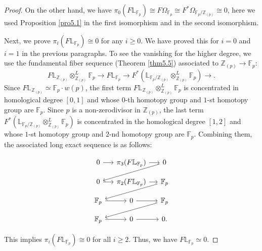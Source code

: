 \documentclass[11pt, a4paper]{amsart}
\theoremstyle{plain}
\theoremstyle{definition}
\begin{document}
\begin{proof}
    On the other hand, we have $\pi_0(F\mathbb L_{\mathbb F_p})\cong F\Omega_{\mathbb F_p}\cong F^*\Omega_{\mathbb F_p/\mathbb Z_{(p)}}\cong 0$, here we used Proposition \ref{pro5.1} in the first isomorphism and \cite[Corollary 2.4.2]{Sai22} in the second isomorphism.

    Next, we prove $\pi_i(F\mathbb L_{\mathbb F_p})\cong 0$ for any $i\ge0$. We have proved this for $i=0$ and $i=1$ in the previous paragraphs. To see the vanishing for the higher degree, we use the fundamental fiber sequence (Theorem \ref{thm5.5}) associated to $\mathbb Z_{(p)}\to \mathbb F_p$:\[F\mathbb L_{\mathbb Z_{(p)}}\otimes^L_{\mathbb Z_{(p)}}\mathbb F_p\to F\mathbb L_{\mathbb F_p}\to F^*(\mathbb L_{\mathbb F_p/\mathbb Z_{(p)}}\otimes_{\mathbb Z_{(p)}}^L\mathbb F_p)\to .\]
    Since $F\mathbb L_{\mathbb Z_{(p)}}\simeq \mathbb F_p\cdot w(p)$, the first term $F\mathbb L_{\mathbb Z_{(p)}}\otimes^L_{\mathbb Z_{(p)}}\mathbb F_p$ is concentrated in homological degree $[0,1]$ and whose $0$-th homotopy group and $1$-st homotopy group are $\mathbb F_p$.  Since $p$ is a non-zerodivisor in $\mathbb Z_{(p)}$, the last term $F^*(\mathbb L_{\mathbb F_p/\mathbb Z_{(p)}}\otimes_{\mathbb Z_{(p)}}^L\mathbb F_p)$ is concentrated in the homological degree $[1,2]$ and whose $1$-st homotopy group and $2$-nd homotopy group are $\mathbb F_p$. Combining them, the associated long exact sequence is as follows:
   

\[\begin{tikzcd}[column sep=small,row sep=small]
0 \arrow[r] &
\pi_3(F\mathbb L_{\mathbb F_p}) \arrow[r] &
0 \arrow[dll,] \\
0 \arrow[r] &
\pi_2(F\mathbb L_{\mathbb F_p}) \arrow[r] &
\mathbb F_p \arrow[dll,] \\
\mathbb F_p \arrow[r] &
0 \arrow[r] &
\mathbb F_p \arrow[dll,] \\
\mathbb F_p \arrow[r] &
0 \arrow[r] &
0.
\end{tikzcd}
\]

This implies $\pi_i(F\mathbb L_{\mathbb F_p})\cong 0$ for all $i\ge2$. Thus, we have $F\mathbb L_{\mathbb F_p}\simeq 0$.
        
    
\end{proof}
\end{document}
